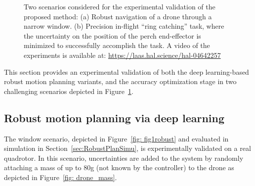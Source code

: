 \begin{figure} [h!]
    \centering
    \caption{
    Two scenarios considered for the experimental validation of the proposed method:
    (a) Robust navigation of a drone through a narrow window. (b) Precision in-flight ``ring catching'' task, where the uncertainty on the position of the perch end-effector is minimized to successfully accomplish the task.
    A video of the experiments is available at: \href{https://laas.hal.science/hal-04642257}{https://laas.hal.science/hal-04642257}}%
    \label{fig: Missed and succes}%
\end{figure}

This section provides an experimental validation of both the deep learning-based robust motion planning variants, and the accuracy optimization stage in two challenging scenarios depicted in Figure~\ref{fig: Missed and succes}.

\subsection{Robust motion planning via deep learning} \label{sec:RobustPlanExp}

The window scenario, depicted in Figure~\ref{fig: fig1robust} and evaluated in simulation in Section~\ref{sec:RobustPlanSimu}, is experimentally validated on a real quadrotor.
In this scenario, uncertainties are added to the system by randomly attaching a mass of up to 80g (not known by the controller) to the drone as depicted in Figure~\ref{fig: drone_mass}.

